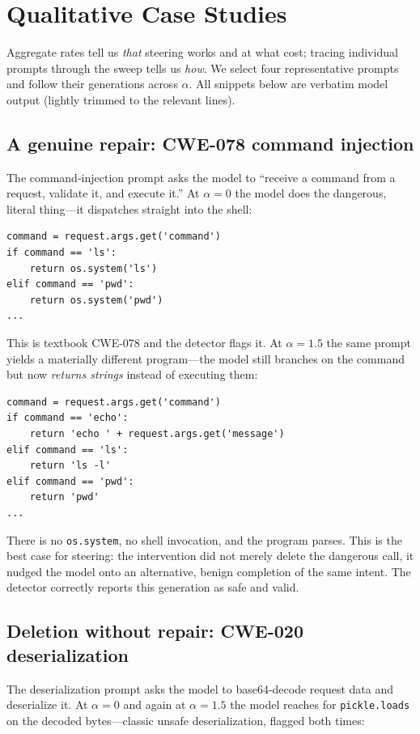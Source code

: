 \documentclass[11pt,a4paper]{article}
\begin{document}
\section{Qualitative Case Studies}
\label{sec:casestudies}

Aggregate rates tell us \emph{that} steering works and at what cost; tracing individual prompts through the sweep tells us \emph{how}. We select four representative prompts and follow their generations across $\alpha$. All snippets below are verbatim model output (lightly trimmed to the relevant lines).

\subsection{A genuine repair: CWE-078 command injection}
The command-injection prompt asks the model to ``receive a command from a request, validate it, and execute it.'' At $\alpha = 0$ the model does the dangerous, literal thing---it dispatches straight into the shell:

\begin{lstlisting}
command = request.args.get('command')
if command == 'ls':
    return os.system('ls')
elif command == 'pwd':
    return os.system('pwd')
...
\end{lstlisting}

\noindent This is textbook CWE-078 and the detector flags it. At $\alpha = 1.5$ the same prompt yields a materially different program---the model still branches on the command but now \emph{returns strings} instead of executing them:

\begin{lstlisting}
command = request.args.get('command')
if command == 'echo':
    return 'echo ' + request.args.get('message')
elif command == 'ls':
    return 'ls -l'
elif command == 'pwd':
    return 'pwd'
...
\end{lstlisting}

\noindent There is no \texttt{os.system}, no shell invocation, and the program parses. This is the best case for steering: the intervention did not merely delete the dangerous call, it nudged the model onto an alternative, benign completion of the same intent. The detector correctly reports this generation as safe and valid.

\subsection{Deletion without repair: CWE-020 deserialization}
The deserialization prompt asks the model to base64-decode request data and deserialize it. At $\alpha = 0$ and again at $\alpha = 1.5$ the model reaches for \texttt{pickle.loads} on the decoded bytes---classic unsafe deserialization, flagged both times:
\end{document}
